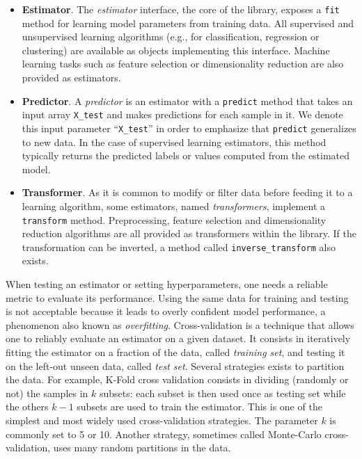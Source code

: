 \documentclass{frontiersSCNS} %
\begin{document}
\begin{itemize}
\item {\bf Estimator}. The \textit{estimator} interface, the core of the
    library, exposes a \texttt{fit} method for learning model parameters from training data.
    All supervised
    and unsupervised learning algorithms (e.g., for classification, regression or
    clustering) are available as objects implementing this interface. Machine
    learning tasks such as feature selection or dimensionality
    reduction are also provided as estimators.

\item {\bf Predictor}. A \textit{predictor} is an estimator with
    a \texttt{predict}
    method that takes an input array \texttt{X\_test} and makes
    predictions for each sample in it.
    We denote this input parameter ``\texttt{X\_test}'' in order
    to emphasize that \texttt{predict} generalizes to new data. In the case of
    supervised learning estimators, this method typically returns the predicted
    labels or values computed from the estimated model.

\item {\bf Transformer}. As it is common to modify or filter data before feeding it to a learning
    algorithm, some estimators, named \textit{transformers}, implement a
    \texttt{transform} method. Preprocessing, feature selection and
    dimensionality reduction
    algorithms are all provided as transformers within the library. If the transformation
    can be inverted, a method called \texttt{inverse\_transform} also exists.

\end{itemize}

\smallskip

When testing an estimator or setting hyperparameters, one needs a reliable
metric to evaluate its performance. Using the same
data for training and testing is not acceptable because it leads to
overly confident model performance, a phenomenon also known as \emph{overfitting}.
Cross-validation is a technique that allows one to reliably evaluate an
estimator on a given dataset. It consists in iteratively fitting the
estimator on a fraction of the data, called \emph{training set}, and testing it
on the left-out unseen data, called \emph{test set}.
Several strategies exists to partition the data.
For example, K-Fold cross validation consists in dividing (randomly or not) the samples in $k$
subsets: each subset is then used once as testing set while the others $k - 1$
subsets are used to train the estimator. This is one of the simplest and most
widely used cross-validation strategies. The parameter $k$ is commonly set
to 5 or 10. Another strategy, sometimes called Monte-Carlo cross-validation,
uses many random partitions in the data.
\end{document}
